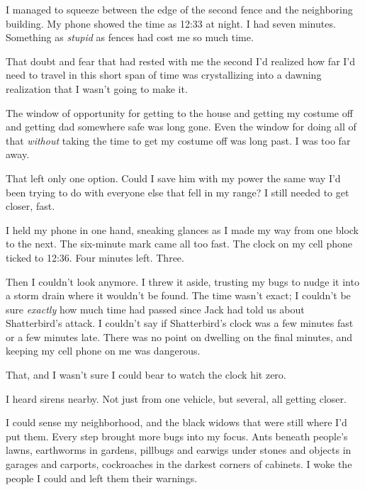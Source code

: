 I managed to squeeze between the edge of the second fence and the neighboring building.  My phone showed the time as 12:33 at night.  I had seven minutes.  Something as \emph{stupid} as fences had cost me so much time.



That doubt and fear that had rested with me the second I'd realized how far I'd need to travel in this short span of time was crystallizing into a dawning realization that I wasn't going to make it.



The window of opportunity for getting to the house and getting my costume off and getting dad somewhere safe was long gone.  Even the window for doing all of that \emph{without} taking the time to get my costume off was long past.  I was too far away.



That left only one option.  Could I save him with my power the same way I'd been trying to do with everyone else that fell in my range?  I still needed to get closer, fast.



I held my phone in one hand, sneaking glances as I made my way from one block to the next.  The six-minute mark came all too fast.  The clock on my cell phone ticked to 12:36.  Four minutes left.  Three.



Then I couldn't look anymore. I threw it aside, trusting my bugs to nudge it into a storm drain where it wouldn't be found.  The time wasn't exact; I couldn't be sure \emph{exactly} how much time had passed since Jack had told us about Shatterbird's attack.  I couldn't say if Shatterbird's clock was a few minutes fast or a few minutes late.  There was no point on dwelling on the final minutes, and keeping my cell phone on me was dangerous.



That, and I wasn't sure I could bear to watch the clock hit zero.



I heard sirens nearby.  Not just from one vehicle, but several, all getting closer.



I could sense my neighborhood, and the black widows that were still where I'd put them.  Every step brought more bugs into my focus.  Ants beneath people's lawns, earthworms in gardens, pillbugs and earwigs under stones and objects in garages and carports, cockroaches in the darkest corners of cabinets.  I woke the people I could and left them their warnings.



